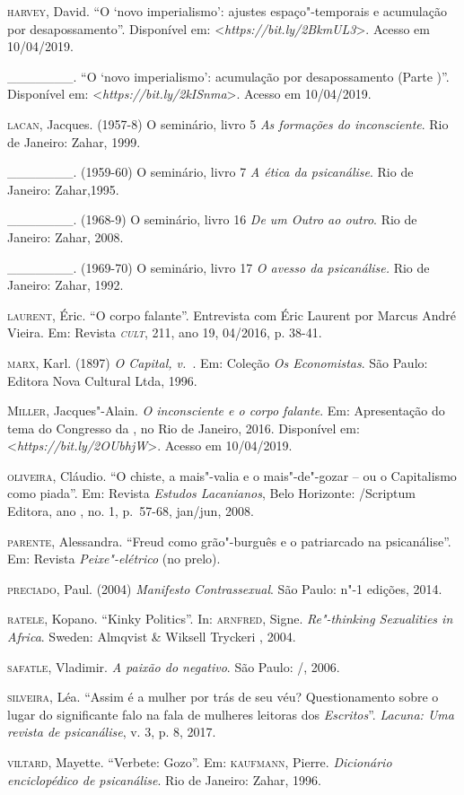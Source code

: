 \begin{Parskip}
\textsc{harvey}, David. ``O `novo imperialismo': ajustes espaço"-temporais e
acumulação por desapossamento''. Disponível em:
\textless{}\emph{https://bit.ly/2BkmUL3}\textgreater{}.
Acesso em 10/04/2019.

\_\_\_\_\_\_\_. ``O `novo imperialismo': acumulação por desapossamento
(Parte )''. Disponível em:
\textless{}\emph{https://bit.ly/2kISnma}\textgreater{}.
Acesso em 10/04/2019.

\textsc{lacan}, Jacques. (1957-8) O seminário, livro 5 \emph{As formações do
inconsciente}. Rio de Janeiro: Zahar, 1999.

\_\_\_\_\_\_\_. (1959-60) O seminário, livro 7 \emph{A ética da
psicanálise}. Rio de Janeiro: Zahar,1995.

\_\_\_\_\_\_\_. (1968-9) O seminário, livro 16 \emph{De um Outro ao
outro}. Rio de Janeiro: Zahar, 2008.

\_\_\_\_\_\_\_. (1969-70) O seminário, livro 17 \emph{O avesso da
psicanálise.} Rio de Janeiro: Zahar, 1992.

\textsc{laurent}, Éric. ``O corpo falante''. Entrevista com Éric Laurent por Marcus
André Vieira. Em: Revista \emph{\textsc{cult}}, 211, ano 19, 04/2016, p. 38-41.

\textsc{marx}, Karl. (1897) \emph{O Capital, v.~}. Em: Coleção \emph{Os
Economistas}. São Paulo: Editora Nova Cultural Ltda, 1996.

\textsc{Miller}, Jacques"-Alain. \emph{O inconsciente e o corpo falante}. Em: Apresentação do
tema do  Congresso da , no Rio de Janeiro, 2016. Disponível em:
\textless{}\emph{https://bit.ly/2OUbhjW}\textgreater{}. Acesso em 10/04/2019.

\textsc{oliveira}, Cláudio. ``O chiste, a mais"-valia e o mais"-de"-gozar -- ou o
Capitalismo como piada''. Em: Revista \emph{Estudos Lacanianos}, Belo
Horizonte: /Scriptum Editora, ano , no. 1, p.~57-68, jan/jun, 2008.

\textsc{parente}, Alessandra. ``Freud como grão"-burguês e o patriarcado na
psicanálise''. Em: Revista \emph{Peixe"-elétrico} (no prelo).

\textsc{preciado}, Paul. (2004) \emph{Manifesto Contrassexual}. São Paulo: n"-1
edições, 2014.

\textsc{ratele}, Kopano. ``Kinky Politics''. In: \textsc{arnfred}, Signe. \emph{Re"-thinking
Sexualities in Africa}. Sweden: Almqvist \& Wiksell Tryckeri , 2004.

\textsc{safatle}, Vladimir. \emph{A paixão do negativo}. São Paulo: /, 2006.

\textsc{silveira}, Léa. ``Assim é a mulher por trás de seu véu? Questionamento
sobre o lugar do significante falo na fala de mulheres leitoras dos
\emph{Escritos}''. \emph{Lacuna: Uma revista de psicanálise}, v. 3, p. 8, 2017.

\textsc{viltard}, Mayette. ``Verbete: Gozo''. Em: \textsc{kaufmann}, Pierre. \emph{Dicionário
enciclopédico de psicanálise}. Rio de Janeiro: Zahar, 1996.
\end{Parskip}